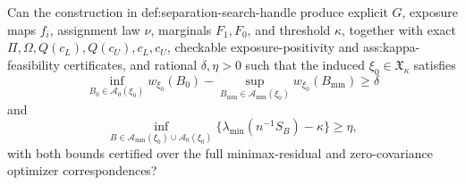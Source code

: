Can the construction in def:separation-search-handle produce explicit \(G\), exposure maps \(f_i\), assignment law \(\nu\), marginals \(F_1,F_0\), and threshold \(\kappa\), together with exact \(\Pi,\Omega,Q(c_L),Q(c_U),c_L,c_U\), checkable exposure-positivity and ass:kappa-feasibility certificates, and rational \(\delta,\eta>0\) such that the induced \(\xi_0\in\mathfrak X_\kappa\) satisfies
\[
\inf_{B_0\in\mathcal A_0(\xi_0)}w_{\xi_0}(B_0)
-\sup_{B_{\mathrm{mm}}\in\mathcal A_{\mathrm{mm}}(\xi_0)}w_{\xi_0}(B_{\mathrm{mm}})\ge\delta
\]
and
\[
\inf_{B\in\mathcal A_{\mathrm{mm}}(\xi_0)\cup\mathcal A_0(\xi_0)}
\{\lambda_{\min}(n^{-1}S_B)-\kappa\}\ge\eta,
\]
with both bounds certified over the full minimax-residual and zero-covariance optimizer correspondences?